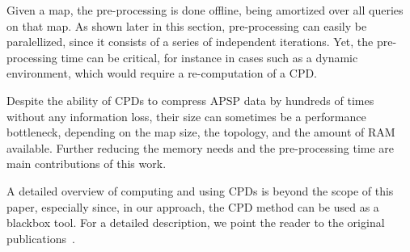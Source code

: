 \documentclass[runningheads,a4paper]{llncs}
\begin{document}
Given a map, the pre-processing is done offline, being amortized over
all queries on that map. As shown later in this section, pre-processing can
easily be paralellized, since it consists of a series of independent
iterations. Yet, the pre-processing time can be critical, for instance in
cases such as a dynamic environment, which would require a re-computation of a CPD.

Despite the ability of CPDs to compress APSP data by hundreds of
times without any information loss,
their size can sometimes be a performance bottleneck,
depending on the map size, the topology, and the amount of RAM available.
Further reducing the memory needs and the pre-processing time are main
contributions of this work.

A detailed overview of computing and using CPDs is beyond the scope of this
paper, especially since, in our approach, the CPD method can be used as a
blackbox tool. For a detailed description, we point the reader to the original
publications~\cite{botea11,DBLP:conf/socs/Botea12}.

% 
\end{document}
